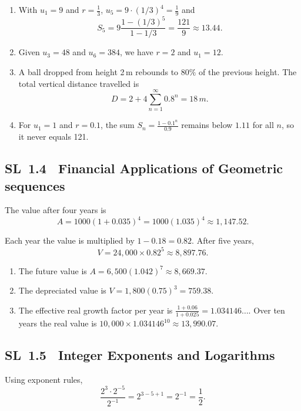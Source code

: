 \documentclass[11pt]{article}
\def\mathrm#1{#1}%
\newcommand{\tocsubsection}[1]{\subsection{#1}}
\begin{document}
\begin{solution}
\begin{enumerate}[label=(\alph*)]
\item With $u_1=9$ and $r=\tfrac{1}{3}$, $u_5 = 9\cdot (1/3)^{4} = \tfrac{1}{9}$ and 
\[
S_5 = 9\frac{1 - (1/3)^5}{1 - 1/3} = \frac{121}{9} \approx 13.44.
\]
\item Given $u_3=48$ and $u_6=384$, we have $r=2$ and $u_1=12$.
\item A ball dropped from height 2\,m rebounds to $80\%$ of the previous height. The total vertical distance travelled is 
\[
D = 2 + 4 \sum_{n=1}^{\infty}0.8^n = 18\,\mathrm{m}.
\]
\item For $u_1=1$ and $r=0.1$, the sum $S_n = \frac{1 - 0.1^n}{0.9}$ remains below $1.11$ for all $n$, so it never equals 121.
\end{enumerate}
\end{solution}


\tocsubsection{SL 1.4 \; Financial Applications of Geometric sequences}


\begin{solution}
The value after four years is 
\[
A = 1000 (1+0.035)^4 = 1000 (1.035)^4 \approx 1{,}147.52.
\]
\end{solution}

\begin{solution}
Each year the value is multiplied by $1-0.18=0.82$. After five years,
\[
V = 24{,}000 \times 0.82^5 \approx 8{,}897.76.
\]
\end{solution}

\begin{solution}
\begin{enumerate}[label=(\alph*)]
\item The future value is $A = 6{,}500(1.042)^7 \approx 8{,}669.37$.
\item The depreciated value is $V = 1{,}800(0.75)^3 = 759.38$.
\item The effective real growth factor per year is $\frac{1+0.06}{1+0.025} = 1.034146\ldots$.  Over ten years the real value is $10{,}000 \times 1.034146^{10} \approx 13{,}990.07$.
\end{enumerate}
\end{solution}


\tocsubsection{SL 1.5 \; Integer Exponents and Logarithms}


\begin{solution}
Using exponent rules,
\[
\frac{2^3\cdot 2^{-5}}{2^{-1}} = 2^{3-5+1} = 2^{-1} = \frac{1}{2}.
\]
\end{solution}
\end{document}
